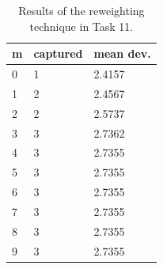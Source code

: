 \begin{table}[]
\caption{Results of the reweighting technique in Task 11.}
\label{table:task11:results}
\centering
\begin{tabular}{l|ll}
m & captured & mean dev. \\
\hline
0 & 1 & 2.4157 \\
1 & 2 & 2.4567 \\
2 & 2 & 2.5737 \\
3 & 3 & 2.7362 \\
4 & 3 & 2.7355 \\
5 & 3 & 2.7355 \\
6 & 3 & 2.7355 \\
7 & 3 & 2.7355 \\
8 & 3 & 2.7355 \\
9 & 3 & 2.7355
\end{tabular}
\end{table}

